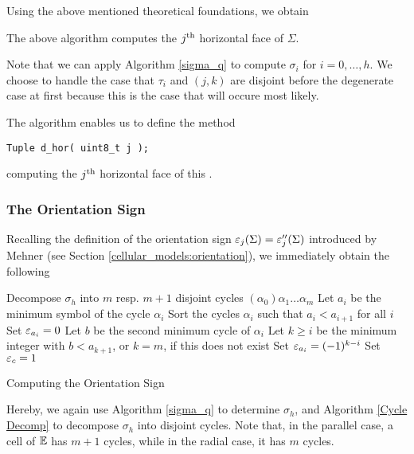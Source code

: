 Using the above mentioned theoretical foundations, we obtain

\begin{prop}
The above algorithm computes the $j^{\text{th}}$ horizontal face of $\Sigma$.
\end{prop}

Note that we can apply Algorithm \ref{sigma_q} to compute $\sigma_i$ for $i = 0, \dotsc, h$.
We choose to handle the case that $\tau_i$ and $(j, k)$ are disjoint before the degenerate case at first
because this is the case that will occure most likely.

The algorithm enables us to define the method
\begin{lstlisting}
Tuple d_hor( uint8_t j );
\end{lstlisting}
computing the $j^{\text{th}}$ horizontal face of this .

\subsubsection{The Orientation Sign}\label{program:kappa:tuple:orientation_sign}

Recalling the definition of the orientation sign $\varepsilon_j(\Sigma) = \varepsilon_j''(\Sigma)$ introduced by Mehner (see Section \ref{cellular_models:orientation}), 
we immediately obtain the following

\begin{algorithm}[H]
\label{orientation_sign}
\DontPrintSemicolon
{}


Decompose $\sigma_h$ into $m$ resp. $m+1$ disjoint cycles $(\alpha_0) \alpha_1 \dotsc \alpha_m$ \;
Let $a_i$ be the minimum symbol of the cycle $\alpha_i$\;
Sort the cycles $\alpha_i$ such that $a_i < a_{i+1}$ for all $i$\;
{
  {
    Set $\varepsilon_{a_i} = 0$\;
  }
  Let $b$ be the second minimum cycle of $\alpha_i$\;
  Let $k \geq i$ be the minimum integer with $b < a_{k+1}$, or $k = m$, if this does not exist\;
  Set $\varepsilon_{a_i} = (-1)^{k - i}$\;
  {
    Set $\varepsilon_c = 1$\;
  }
}

\caption{Computing the Orientation Sign}

\end{algorithm}

Hereby, we again use Algorithm \ref{sigma_q} to determine $\sigma_h$, 
and Algorithm \ref{Cycle Decomp} to decompose $\sigma_h$ into disjoint cycles.
Note that, in the parallel case, a cell of $\mathbb E$ has $m+1$ cycles, while in the radial case, it has $m$ cycles.

